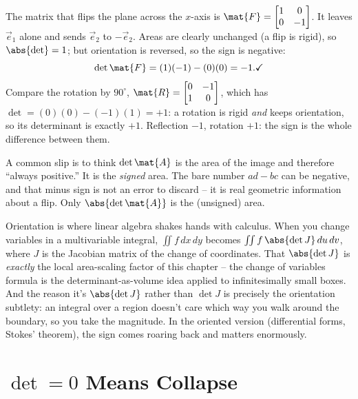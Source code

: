 \begin{example}
\label{ch21:ex-reflection}
The matrix that flips the plane across the $x$-axis is
$\mat{F} = \begin{bmatrix} 1 & 0 \\ 0 & -1 \end{bmatrix}$. It leaves $\vec e_1$
alone and sends $\vec e_2$ to $-\vec e_2$. Areas are clearly unchanged (a flip is
rigid), so $\abs{\det} = 1$; but orientation is reversed, so the sign is negative:
\[
  \det\mat{F} = (1)(-1) - (0)(0) = -1. \checkmark
\]
Compare the rotation by $90^\circ$, $\mat{R} = \begin{bmatrix} 0 & -1 \\ 1 & 0 \end{bmatrix}$,
which has $\det = (0)(0) - (-1)(1) = +1$: a rotation is rigid \emph{and} keeps
orientation, so its determinant is exactly $+1$. Reflection $-1$, rotation $+1$:
the sign is the whole difference between them.
\end{example}

\begin{trapbox}
A common slip is to think $\det\mat{A}$ is the area of the image and therefore
``always positive.'' It is the \emph{signed} area. The bare number $ad-bc$ can be
negative, and that minus sign is not an error to discard -- it is real geometric
information about a flip. Only $\abs{\det\mat{A}}$ is the (unsigned) area.
\end{trapbox}

\begin{connectionbox}
Orientation is where linear algebra shakes hands with calculus. When you change
variables in a multivariable integral, $\iint f\,dx\,dy$ becomes
$\iint f\,\abs{\det J}\,du\,dv$, where $J$ is the Jacobian matrix of the change of
coordinates. That $\abs{\det J}$ is \emph{exactly} the local area-scaling factor of
this chapter -- the change of variables formula is the determinant-as-volume idea
applied to infinitesimally small boxes. And the reason it's $\abs{\det J}$ rather
than $\det J$ is precisely the orientation subtlety: an integral over a region
doesn't care which way you walk around the boundary, so you take the magnitude. In
the oriented version (differential forms, Stokes' theorem), the sign comes roaring
back and matters enormously.
\end{connectionbox}

\section{$\det = 0$ Means Collapse}
\label{ch21:singular}


